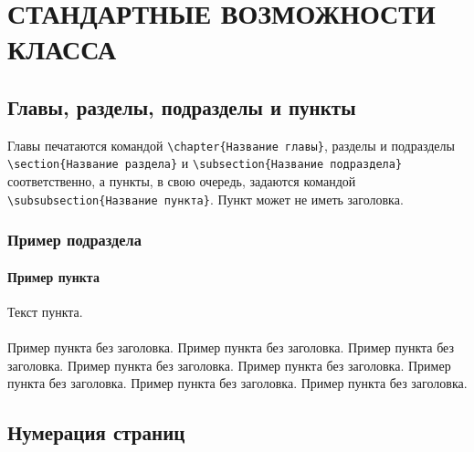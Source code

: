 \newpage
\chapter{СТАНДАРТНЫЕ ВОЗМОЖНОСТИ КЛАССА}

\section{Главы, разделы, подразделы и пункты}

Главы печатаются командой \verb|\chapter{Название главы}|, разделы и подразделы
\verb|\section{Название раздела}| и \verb|\subsection{Название подраздела}|
соответственно, а пункты, в свою очередь, задаются командой
\verb|\subsubsection{Название пункта}|. Пункт может не иметь заголовка.

\subsection{Пример подраздела}

\subsubsection{Пример пункта}

Текст пункта.

\subsubsection{} Пример пункта без заголовка. Пример пункта без заголовка. Пример пункта без заголовка. Пример пункта без заголовка. Пример пункта без заголовка. Пример пункта без заголовка. Пример пункта без заголовка. Пример пункта без заголовка.


\section{Нумерация страниц}

